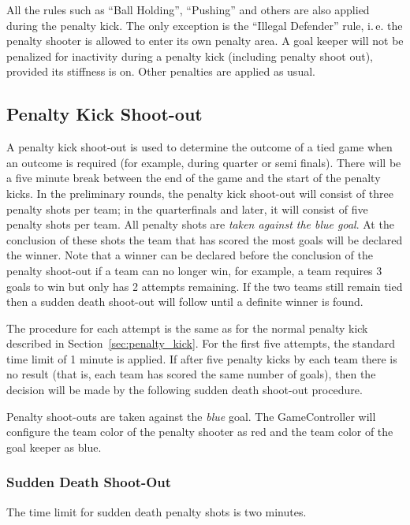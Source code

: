 \documentclass[12pt]{article}
\newcommand{\ie}{\mbox{i.\,e.}\xspace}
\begin{document}
All the rules such as ``Ball Holding'', ``Pushing'' and others are also applied during the penalty kick. The only exception is the ``Illegal Defender'' rule, \ie the penalty shooter is allowed to enter its own penalty area.
A goal keeper will not be penalized for inactivity during a penalty kick (including penalty shoot out), provided its stiffness is on. Other penalties are applied as usual.

\subsection{Penalty Kick Shoot-out}
\label{sec:penalty_shoot-out}

A penalty kick shoot-out is used to determine the outcome of a tied game when an outcome is required (for example, during quarter or semi finals). 
There will be a five minute break between the end of the game and the start of the penalty kicks.
In the preliminary rounds, the penalty kick shoot-out will consist of three penalty shots per team; in the quarterfinals and later, it will consist of five penalty shots per team.
All penalty shots are \emph{taken against the blue goal}. At the conclusion of these shots the team that has scored the most goals will be declared the winner. Note that a winner can be declared before the conclusion of the penalty shoot-out if a team can no longer win, for example, a team requires 3 goals to win but only has 2 attempts remaining. If the two teams still remain tied then a sudden death shoot-out will follow until a definite winner is found.

The procedure for each attempt is the same as for the normal penalty kick described in Section~\ref{sec:penalty_kick}. For the first five attempts, the standard time limit of 1 minute is applied. If after five penalty kicks by each team there is no result (that is, each team has scored the same number of goals), then the decision will be made by the following sudden death shoot-out procedure.

Penalty shoot-outs are taken against the \emph{blue} goal. The GameController will configure the team color of the penalty shooter as red and the team color of the goal keeper as blue.

\subsubsection{Sudden Death Shoot-Out}

The time limit for sudden death penalty shots is two minutes.
\end{document}
